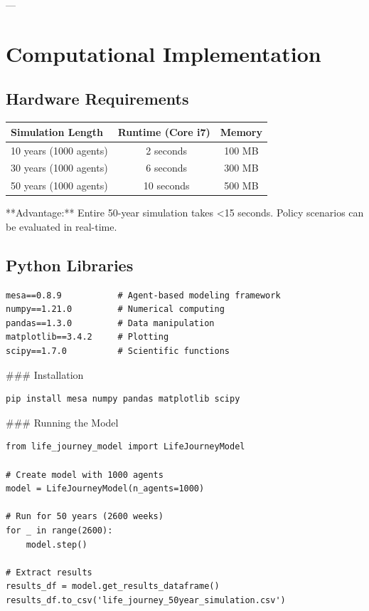 ---


\section{Computational Implementation}
\label{ppp:compute}

\subsection{Hardware Requirements}

\begin{center}
\small
\begin{tabular}{@{}lcc@{}}
\toprule
\textbf{Simulation Length} & \textbf{Runtime (Core i7)} & \textbf{Memory} \\
\midrule
10 years (1000 agents) & ~2 seconds & 100 MB \\
30 years (1000 agents) & ~6 seconds & 300 MB \\
50 years (1000 agents) & ~10 seconds & 500 MB \\
\midrule
\end{tabular}
\end{center}

**Advantage:** Entire 50-year simulation takes <15 seconds. Policy scenarios can be evaluated in real-time.

\subsection{Python Libraries}

\begin{verbatim}
mesa==0.8.9           # Agent-based modeling framework
numpy==1.21.0         # Numerical computing
pandas==1.3.0         # Data manipulation
matplotlib==3.4.2     # Plotting
scipy==1.7.0          # Scientific functions
\end{verbatim}

### Installation

\begin{verbatim}
pip install mesa numpy pandas matplotlib scipy
\end{verbatim}

### Running the Model

\begin{verbatim}
from life_journey_model import LifeJourneyModel

# Create model with 1000 agents
model = LifeJourneyModel(n_agents=1000)

# Run for 50 years (2600 weeks)
for _ in range(2600):
    model.step()

# Extract results
results_df = model.get_results_dataframe()
results_df.to_csv('life_journey_50year_simulation.csv')
\end{verbatim}

